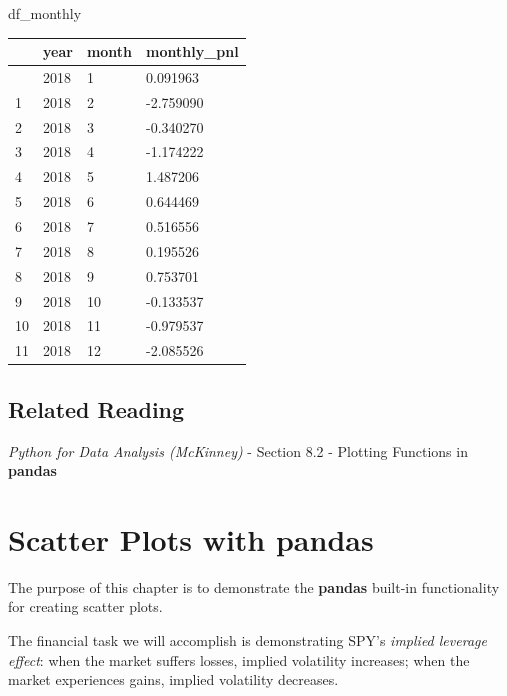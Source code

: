 \documentclass[
  letterpaper,
  DIV=11,
  numbers=noendperiod]{scrreprt}
\newenvironment{Shaded}{\begin{snugshade}}{\end{snugshade}}
\newcommand{\NormalTok}[1]{\textcolor[rgb]{0.00,0.23,0.31}{#1}}
\begin{document}
\begin{Shaded}
\begin{Highlighting}[]
\NormalTok{df\_monthly}
\end{Highlighting}
\end{Shaded}

\begin{longtable}[]{@{}llll@{}}
\toprule\noalign{}
& year & month & monthly\_pnl \\
\midrule\noalign{}
\endhead
\bottomrule\noalign{}
\endlastfoot
0 & 2018 & 1 & 0.091963 \\
1 & 2018 & 2 & -2.759090 \\
2 & 2018 & 3 & -0.340270 \\
3 & 2018 & 4 & -1.174222 \\
4 & 2018 & 5 & 1.487206 \\
5 & 2018 & 6 & 0.644469 \\
6 & 2018 & 7 & 0.516556 \\
7 & 2018 & 8 & 0.195526 \\
8 & 2018 & 9 & 0.753701 \\
9 & 2018 & 10 & -0.133537 \\
10 & 2018 & 11 & -0.979537 \\
11 & 2018 & 12 & -2.085526 \\
\end{longtable}

\hypertarget{related-reading-7}{%
\section{Related Reading}\label{related-reading-7}}

\emph{Python for Data Analysis (McKinney)} - Section 8.2 - Plotting
Functions in \textbf{pandas}

\hypertarget{scatter-plots-with-pandas}{%
\chapter{\texorpdfstring{Scatter Plots with
\textbf{pandas}}{Scatter Plots with pandas}}\label{scatter-plots-with-pandas}}

The purpose of this chapter is to demonstrate the \textbf{pandas}
built-in functionality for creating scatter plots.

The financial task we will accomplish is demonstrating SPY's
\emph{implied leverage effect}: when the market suffers losses, implied
volatility increases; when the market experiences gains, implied
volatility decreases.
\end{document}

